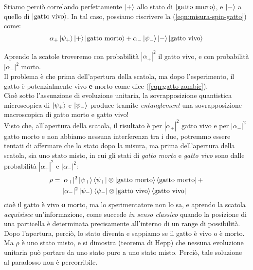 \documentclass[../../FisicaTeorica.tex]{subfiles}
\begin{document}
Stiamo perciò correlando perfettamente $\Ket{+}$ allo stato di $\Ket{\text{gatto morto}}$, e $\Ket{-}$ a quello di $\Ket{\text{gatto vivo}}$. In tal caso, possiamo riscrivere la (\ref{eqn:misura-spin-gatto}) come:
\begin{align}
\alpha_+ \Ket{\psi_+} \Ket{+} \Ket{\text{gatto morto}} + \alpha_- \Ket{\psi_-} \Ket{-} \Ket{\text{gatto vivo}}
\label{eqn:gatto-zombie}
\end{align} 

Aprendo la scatole troveremo con probabilità $|\alpha_+|^2$ il gatto vivo, e con probabilità $|\alpha_-|^2$ morto.\\

Il problema è che prima dell'apertura della scatola, ma dopo l'esperimento, il gatto è potenzialmente vivo \textbf{e} morto come dice (\ref{eqn:gatto-zombie}).\\
Cioè sotto l'assunzione di evoluzione unitaria, la sovrapposizione quantistica microscopica di $\Ket{\psi_+}$ e $\Ket{\psi_-}$ produce tramite \textit{entanglement} una sovrapposizione macroscopica di gatto morto e gatto vivo!\\

Visto che, all'apertura della scatola, il risultato è per $|\alpha_+|^2$ gatto vivo e per $|\alpha_-|^2$ gatto morto e non abbiamo nessuna interferenza tra i due, potremmo essere tentati di affermare che lo stato dopo la misura, ma prima dell'apertura della scatola, sia uno stato misto, in cui gli stati di \textit{gatto morto} e \textit{gatto vivo} sono  dalle probabilità $|\alpha_+|^2$ e $|\alpha_-|^2$:
\begin{align*}
\rho &= |\alpha_+|^2 \Ket{\psi_+}\Bra{\psi_+} \otimes \Ket{\text{gatto morto}}\Bra{\text{gatto morto}} + \\
&\quad \>\,|\alpha_-|^2 \Ket{\psi_-}\Bra{\psi_-} \otimes \Ket{\text{gatto vivo}}\Bra{\text{gatto vivo}}
\end{align*}
cioè il gatto è vivo \textbf{o} morto, ma lo sperimentatore non lo sa, e aprendo la scatola \textit{acquisisce} un'informazione, come succede \textit{in senso classico} quando la posizione di una particella è determinata precisamente all'interno di un range di possibilità.\\
Dopo l'apertura, perciò, lo stato diventa  e sappiamo se il gatto è vivo o è morto.\\

Ma $\rho$ è uno stato misto, e si dimostra (teorema di Hepp) che nessuna evoluzione unitaria può portare da uno stato puro a uno stato misto. Perciò, tale soluzione  al paradosso non è percorribile.\\
\end{document}
